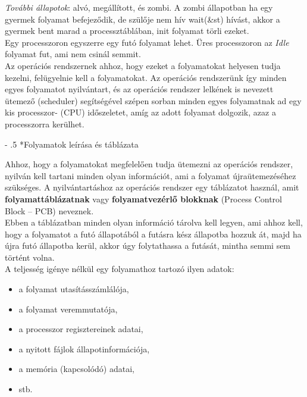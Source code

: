 \documentclass[tikz,12pt,margin=0px]{article}
\makeatletter
\renewcommand\paragraph{%
	\@startsection{paragraph}{4}{0mm}%
	{-\baselineskip}%
	{.5\baselineskip}%
	{\normalfont\normalsize\bfseries}}
\makeatother
\begin{document}
    \noindent \textit{További állapotok}: alvó, megállított, és zombi. A zombi állapotban ha egy gyermek folyamat befejeződik, de szülője nem hív wait(\&st) hívást, akkor a gyermek bent marad a processztáblában, init folyamat törli ezeket.\\

    \noindent Egy processzoron egyszerre egy futó folyamat lehet. Üres processzoron az \emph{Idle} folyamat fut, ami nem csinál semmit.\\
	
    \noindent Az operációs rendszernek ahhoz, hogy ezeket a folyamatokat helyesen tudja kezelni, felügyelnie kell a folyamatokat. Az operációs rendszerünk így minden egyes folyamatot nyilvántart, és az operációs rendszer lelkének is nevezett ütemező (scheduler) segítségével szépen sorban minden egyes folyamatnak ad egy kis processzor- (CPU) időszeletet, amíg az adott folyamat dolgozik, azaz a processzorra kerülhet.

    \paragraph*{Folyamatok leírása és táblázata}

    \noindent Ahhoz, hogy a folyamatokat megfelelően tudja ütemezni az operációs rendszer, nyilván kell tartani minden olyan információt, ami a folyamat újraütemezéséhez szükséges. A nyilvántartáshoz az operációs rendszer egy táblázatot használ, amit \textbf{folyamattáblázatnak} vagy \textbf{folyamatvezérlő blokknak} (Process Control Block – PCB) neveznek.\\

    \noindent Ebben a táblázatban minden olyan információ tárolva kell legyen, ami ahhoz kell, hogy a folyamatot a futó állapotából a futásra kész állapotba hozzuk át, majd ha újra futó állapotba kerül, akkor úgy folytathassa a futását, mintha semmi sem történt volna.\\

    \noindent A teljesség igénye nélkül egy folyamathoz tartozó ilyen adatok:
    \begin{itemize}[topsep=8pt,itemsep=4pt,partopsep=4pt, parsep=4pt]
        \item a folyamat utasításszámlálója,
        \item a folyamat veremmutatója,
        \item a processzor regisztereinek adatai,
        \item a nyitott fájlok állapotinformációja,
        \item a memória (kapcsolódó) adatai,
        \item stb.
    \end{itemize}
\end{document}
